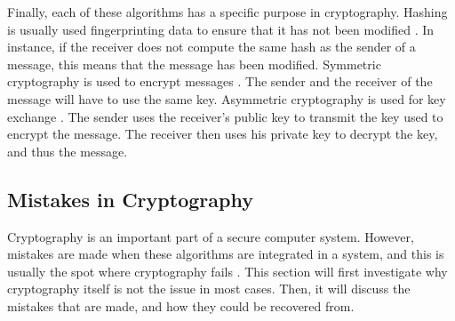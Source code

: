 \documentclass{l4proj}
\begin{document}
Finally, each of these algorithms has a specific purpose in cryptography.
Hashing is usually used fingerprinting data to ensure that it has not been modified \citep{kessler_overview_2016}.
In instance, if the receiver does not compute the same hash as the sender of a message, 
this means that the message has been modified. 
Symmetric cryptography is used to encrypt messages \citep{kessler_overview_2016}. 
The sender and the receiver of the message will have to use the same key.
Asymmetric cryptography is used for key exchange \citep{kessler_overview_2016}.
The sender uses the receiver's public key to transmit the key used to encrypt the message.
The receiver then uses his private key to decrypt the key, and thus the message.

\subsection{Mistakes in Cryptography}

Cryptography is an important part of a secure computer system. However, mistakes are made when these algorithms are integrated in a system,
and this is usually the spot where cryptography fails \citep{lazar_why_2014}. This section will first investigate why cryptography itself is not the issue in most cases.
Then, it will discuss the mistakes that are made, and how they could be recovered from.
\end{document}
